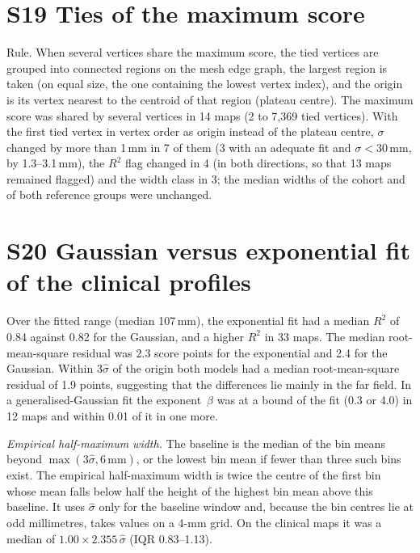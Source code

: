 \documentclass[10pt,a4paper]{article}
\renewcommand{\thetable}{S\arabic{table}}
\newcommand{\stab}[1]{\renewcommand{\thetable}{#1}}
\begin{document}
\section*{S19 Ties of the maximum score}
Rule.  When several vertices share the maximum score, the tied vertices are grouped into connected regions on the mesh edge graph, the largest region is taken (on equal size, the one containing the lowest vertex index), and the origin is its vertex nearest to the centroid of that region (plateau centre).
The maximum score was shared by several vertices in 14 maps (2 to 7{,}369 tied vertices).  With the first tied vertex in vertex order as origin instead of the plateau centre, $\sigma$ changed by more than 1\,mm in 7 of them (3 with an adequate fit and $\sigma < 30$\,mm, by 1.3--3.1\,mm), the $R^2$ flag changed in 4 (in both directions, so that 13 maps remained flagged) and the width class in 3; the median widths of the cohort and of both reference groups were unchanged.
\stab{S19}
\section*{S20 Gaussian versus exponential fit of the clinical profiles}
Over the fitted range (median 107\,mm), the exponential fit had a median $R^2$ of 0.84 against 0.82 for the Gaussian, and a higher $R^2$ in 33 maps.  The median root-mean-square residual was 2.3 score points for the exponential and 2.4 for the Gaussian.  Within $3\hat\sigma$ of the origin both models had a median root-mean-square residual of 1.9 points, suggesting that the differences lie mainly in the far field.  In a generalised-Gaussian fit the exponent~$\beta$ was at a bound of the fit (0.3 or 4.0) in 12 maps and within 0.01 of it in one more.

\textit{Empirical half-maximum width.}  The baseline is the median of the bin means beyond $\max(3\hat\sigma, 6\,\mathrm{mm})$, or the lowest bin mean if fewer than three such bins exist.  The empirical half-maximum width is twice the centre of the first bin whose mean falls below half the height of the highest bin mean above this baseline.  It uses $\hat\sigma$ only for the baseline window and, because the bin centres lie at odd millimetres, takes values on a 4-mm grid.  On the clinical maps it was a median of $1.00 \times 2.355\,\hat\sigma$ (IQR 0.83--1.13).
\stab{S20}
\end{document}
